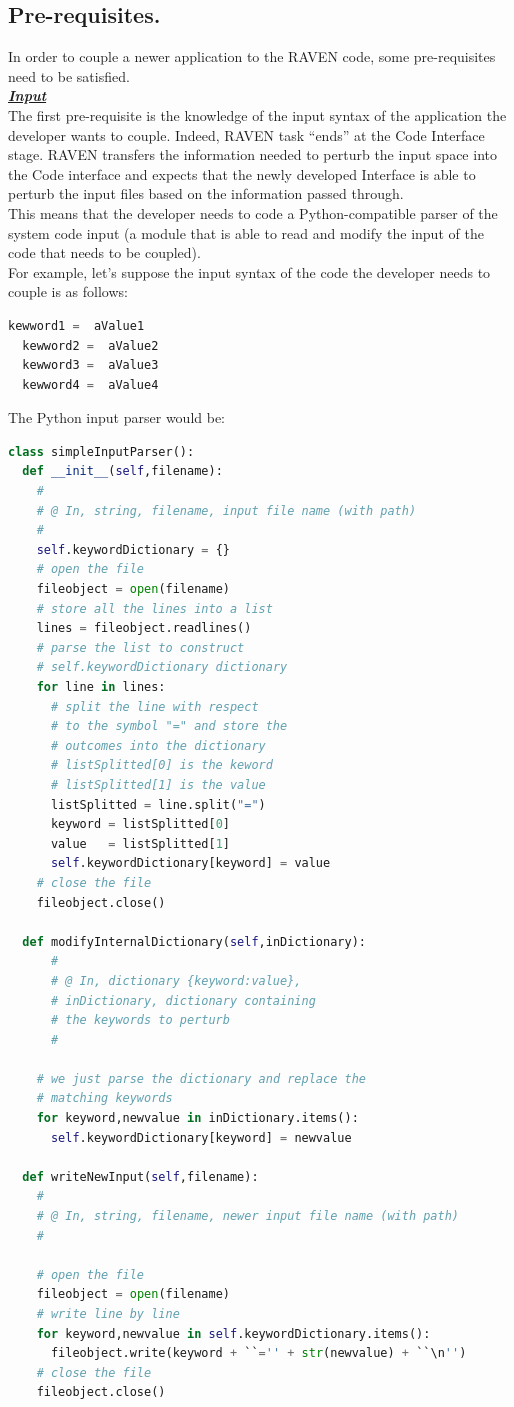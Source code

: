 \subsection{Pre-requisites.}
\label{subsec:prerequisites}
In order to couple a newer application to the RAVEN code, some pre-requisites need to be satisfied.
\newline
\\\textbf{\textit{\underline{Input}}}
\newline
\\ The first pre-requisite is the knowledge of the input
syntax of the application the developer wants to couple. Indeed, RAVEN task
 ``ends'' at the Code Interface stage. RAVEN transfers the information needed
 to perturb the input space into the Code interface and expects that the newly
 developed Interface is able to perturb the input files based on the information
 passed through.
\\This means that the developer needs to code a Python-compatible parser of
 the system code input (a module that is able to read and modify the input of
 the code that needs to be coupled).
\\ For example, let's suppose the input syntax of the code the developer needs
to couple is as follows:
\begin{lstlisting}[language=python]
  kewword1 =  aValue1
  kewword2 =  aValue2
  kewword3 =  aValue3
  kewword4 =  aValue4
\end{lstlisting}
The Python input parser would be:
\begin{lstlisting}[language=python]
class simpleInputParser():
  def __init__(self,filename):
    #
    # @ In, string, filename, input file name (with path)
    #
    self.keywordDictionary = {}
    # open the file
    fileobject = open(filename)
    # store all the lines into a list
    lines = fileobject.readlines()
    # parse the list to construct
    # self.keywordDictionary dictionary
    for line in lines:
      # split the line with respect
      # to the symbol "=" and store the
      # outcomes into the dictionary
      # listSplitted[0] is the keword
      # listSplitted[1] is the value
      listSplitted = line.split("=")
      keyword = listSplitted[0]
      value   = listSplitted[1]
      self.keywordDictionary[keyword] = value
    # close the file
    fileobject.close()

  def modifyInternalDictionary(self,inDictionary):
      #
      # @ In, dictionary {keyword:value},
      # inDictionary, dictionary containing
      # the keywords to perturb
      #

    # we just parse the dictionary and replace the
    # matching keywords
    for keyword,newvalue in inDictionary.items():
      self.keywordDictionary[keyword] = newvalue

  def writeNewInput(self,filename):
    #
    # @ In, string, filename, newer input file name (with path)
    #

    # open the file
    fileobject = open(filename)
    # write line by line
    for keyword,newvalue in self.keywordDictionary.items():
      fileobject.write(keyword + ``='' + str(newvalue) + ``\n'')
    # close the file
    fileobject.close()
\end{lstlisting}
